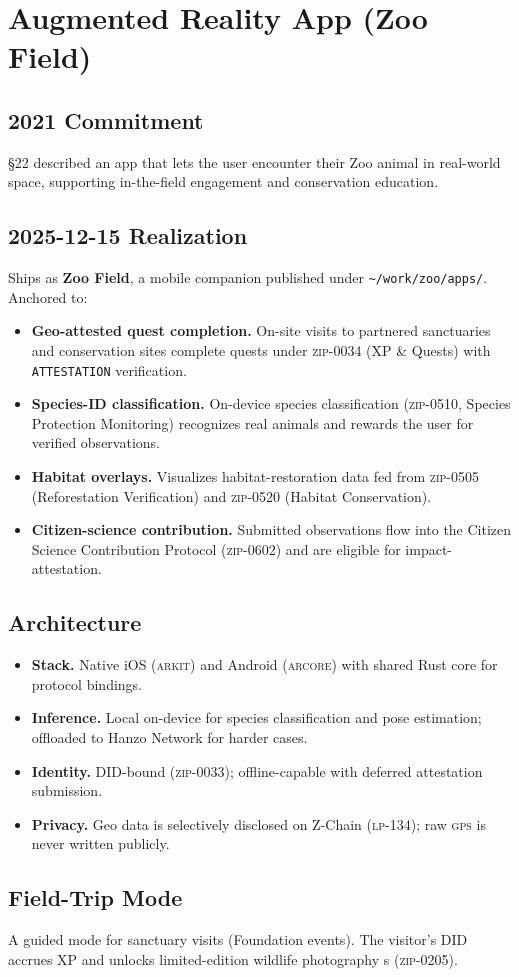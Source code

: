 \section{Augmented Reality App (Zoo Field)}
\label{sec:ar}

\subsection{2021 Commitment}

\S22 described an \AR{} app that lets the user encounter their Zoo
\NFT{} animal in real-world space, supporting in-the-field engagement
and conservation education.

\subsection{2025-12-15 Realization}

Ships as \textbf{Zoo Field}, a mobile \AR{} companion published under
\texttt{\textasciitilde/work/zoo/apps/}. Anchored to:

\begin{itemize}[nosep,leftmargin=1.2em]
\item \textbf{Geo-attested quest completion.} On-site visits to
  partnered sanctuaries and conservation sites complete quests under
  \textsc{zip-0034} (XP \& Quests) with \texttt{ATTESTATION}
  verification.
\item \textbf{Species-ID classification.} On-device species
  classification (\textsc{zip-0510}, Species Protection Monitoring)
  recognizes real animals and rewards the user for verified
  observations.
\item \textbf{Habitat overlays.} Visualizes habitat-restoration data
  fed from \textsc{zip-0505} (Reforestation Verification) and
  \textsc{zip-0520} (Habitat Conservation).
\item \textbf{Citizen-science contribution.} Submitted observations
  flow into the Citizen Science Contribution Protocol
  (\textsc{zip-0602}) and are eligible for impact-attestation.
\end{itemize}

\subsection{Architecture}

\begin{itemize}[nosep,leftmargin=1.2em]
\item \textbf{Stack.} Native iOS (\textsc{arkit}) and Android
  (\textsc{arcore}) with shared Rust core for protocol bindings.
\item \textbf{Inference.} Local on-device for species classification
  and pose estimation; offloaded to Hanzo Network for harder cases.
\item \textbf{Identity.} DID-bound (\textsc{zip-0033}); offline-capable
  with deferred attestation submission.
\item \textbf{Privacy.} Geo data is selectively disclosed on Z-Chain
  (\textsc{lp-134}); raw \textsc{gps} is never written publicly.
\end{itemize}

\subsection{Field-Trip Mode}

A guided mode for sanctuary visits (Foundation events). The visitor's
DID accrues XP and unlocks limited-edition wildlife photography \NFT{}s
(\textsc{zip-0205}).
